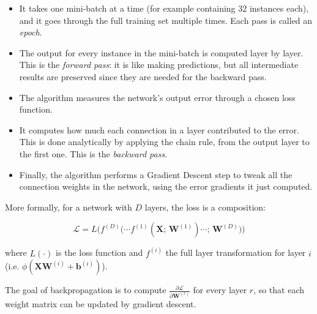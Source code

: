 \begin{itemize}
    \item It takes one mini-batch at a time (for example containing 32 instances each), and it goes through the full training set multiple times. Each pass is called an \textit{epoch}.
    \item The output for every instance in the mini-batch is computed layer by layer. This is the \textit{forward pass}: it is like making predictions, but all intermediate results are preserved since they are needed for the backward pass.
    \item The algorithm measures the network's output error through a chosen loss function.
    \item It computes how much each connection in a layer contributed to the error. This is done analytically by applying the chain rule, from the output layer to the first one. This is the \textit{backward pass}.
    \item Finally, the algorithm performs a Gradient Descent step to tweak all the connection weights in the network, using the error gradients it just computed.
\end{itemize}


More formally, for a network with $D$ layers, the loss is a composition:

\begin{equation}
    \mathcal{L} = L\!\Big(f^{(D)}\big(\cdots f^{(1)}(\mathbf{X};\, \mathbf{W}^{(1)}) \cdots;\, \mathbf{W}^{(D)}\big)\Big)
\end{equation}

where $L(\cdot)$ is the loss function and $f^{(i)}$ the full layer transformation for layer $i$ (i.e. $\phi\!\left(\mathbf{X}\mathbf{W}^{(i)} + \mathbf{b}^{(i)}\right)$).

The goal of backpropagation is to compute $\frac{\partial \mathcal{L}}{\partial \mathbf{W}^{(r)}}$ for every layer $r$, so that each weight matrix can be updated by gradient descent.

